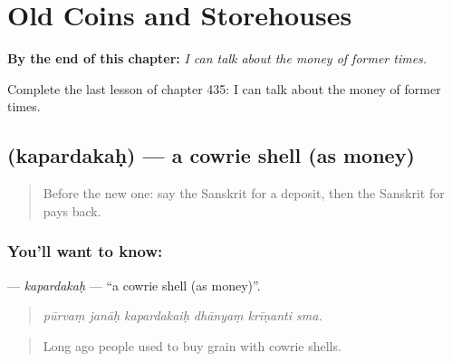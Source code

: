
\chapter{Old Coins and Storehouses}
\label{ch:sa-old-coins-and-storehouses}

\begin{chapteropening}
\textbf{By the end of this chapter:} \emph{I can talk about the money of former times.}

Complete the last lesson of chapter 435: I can talk about the money of former times.
\end{chapteropening}

\section[\texorpdfstring{\sk{कपर्दकः} (kapardakaḥ)}{कपर्दकः (kapardakaḥ)}]{ (kapardakaḥ) — a cowrie shell (as money)}

\label{lesson:SA-C435-kapardakah}



\begin{quote}
Before the new one: say the Sanskrit for a deposit, then the Sanskrit for pays back.
\end{quote}

\subsection*{You'll want to know: }
\textbf{} — \emph{kapardakaḥ} — \textquotedblleft{}a cowrie shell (as money)\textquotedblright{}.

\begin{quote}
     
\end{quote}

\begin{quote}
\emph{pūrvaṃ janāḥ kapardakaiḥ dhānyaṃ krīṇanti sma.}
\end{quote}

\begin{quote}
Long ago people used to buy grain with cowrie shells.
\end{quote}

